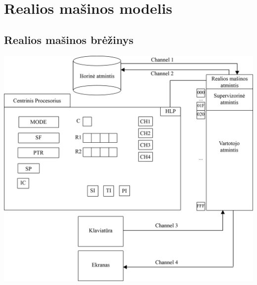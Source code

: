\section{Realios mašinos modelis}
	\subsection{Realios mašinos brėžinys}
	\begin{flushleft}
	\includegraphics[scale=0.9]{OSv1.png}
	\end{flushleft}
